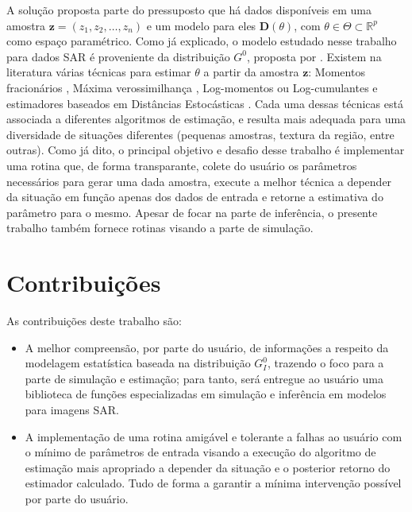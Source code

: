 A solução proposta parte do pressuposto que há dados disponíveis em uma amostra $\bm z = (z_1, z_2, \dots, z_n)$ e um modelo para eles $\bm D(\theta)$, com $\theta \in \Theta \subset \mathbb{R}^{p}$ como espaço paramétrico. 
Como já explicado, o modelo estudado nesse trabalho para dados SAR é proveniente da distribuição $G^0$, proposta por \citet{Clutter1997}. 
Existem na literatura várias técnicas para estimar $\theta$ a partir da amostra $\bm z$: 
Momentos fracionários \citep{Mejail2002}, 
Máxima verossimilhança \citep{FreryMinute2004}, 
Log-momentos ou Log-cumulantes \citep{krylov2013,nicolas2002} e 
estimadores baseados em Distâncias Estocásticas \citep{Cassetti2013,FreryStochasticDistances2015}. 
Cada uma dessas técnicas está associada a diferentes algoritmos de estimação, e resulta mais adequada para uma diversidade de situações diferentes (pequenas amostras, textura da região, entre outras). 
Como já dito, o principal objetivo e desafio desse trabalho é implementar uma rotina que, de forma transparante, colete do usuário os parâmetros necessários para gerar uma dada amostra, execute a melhor técnica a depender da situação em função apenas dos dados de entrada e retorne a estimativa do parâmetro para o mesmo. Apesar de focar na parte de inferência, o presente trabalho também fornece rotinas visando a parte de simulação.


\section{Contribuições}

As contribuições deste trabalho são:
\begin{itemize}
\item A melhor compreensão, por parte do usuário, de informações a respeito da modelagem estatística baseada na distribuição $G_I^0$, trazendo o foco para a parte de simulação e estimação; para tanto, será entregue ao usuário uma biblioteca de funções especializadas em simulação e inferência em modelos para imagens SAR. 
\item A implementação de uma rotina amigável e tolerante a falhas ao usuário com o mínimo de parâmetros de entrada visando a execução do algoritmo de estimação mais apropriado a depender da situação e o posterior retorno do estimador calculado. 
Tudo de forma a garantir a mínima intervenção possível por parte do usuário.
\end{itemize}

